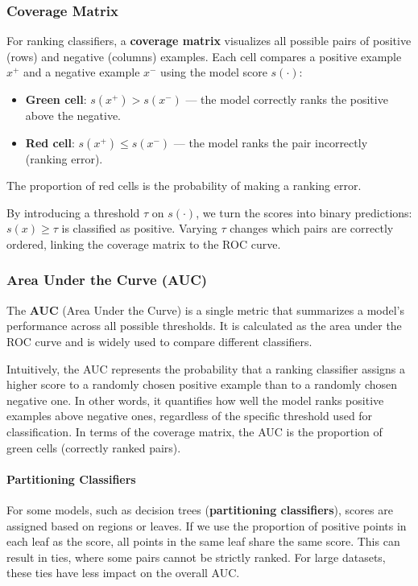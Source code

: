 \subsubsection{Coverage Matrix}
For ranking classifiers, a \textbf{coverage matrix} visualizes all possible pairs of positive (rows) and negative (columns) examples.
Each cell compares a positive example $x^+$ and a negative example $x^-$ using the model score $s(\cdot)$:
\begin{itemize}
    \item \textbf{Green cell}: $s(x^+) > s(x^-)$ — the model correctly ranks the positive above the negative.
    \item \textbf{Red cell}: $s(x^+) \leq s(x^-)$ — the model ranks the pair incorrectly (ranking error).
\end{itemize}
The proportion of red cells is the probability of making a ranking error.

By introducing a threshold $\tau$ on $s(\cdot)$, we turn the scores into binary predictions: $s(x) \geq \tau$ is classified as positive. 
Varying $\tau$ changes which pairs are correctly ordered, linking the coverage matrix to the ROC curve.

\subsubsection{Area Under the Curve (AUC)}
The \textbf{AUC} (Area Under the Curve) is a single metric that summarizes a model's performance across all possible thresholds.
It is calculated as the area under the ROC curve and is widely used to compare different classifiers.

Intuitively, the AUC represents the probability that a ranking classifier assigns a higher score to a randomly chosen positive example than to a randomly chosen negative one.
In other words, it quantifies how well the model ranks positive examples above negative ones, regardless of the specific threshold used for classification.
In terms of the coverage matrix, the AUC is the proportion of green cells (correctly ranked pairs).

\paragraph{Partitioning Classifiers}
For some models, such as decision trees (\textbf{partitioning classifiers}), scores are assigned based on regions or leaves.
If we use the proportion of positive points in each leaf as the score, all points in the same leaf share the same score.
This can result in ties, where some pairs cannot be strictly ranked.
For large datasets, these ties have less impact on the overall AUC.

